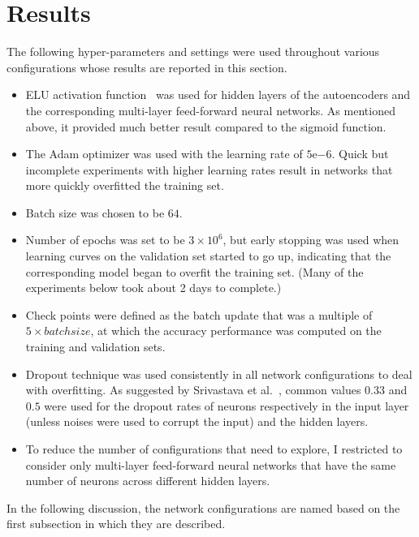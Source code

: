 \documentclass[12pt]{article}
\begin{document}
\section{Results}
\label{sec:results}

\noindent
The following hyper-parameters and settings were used throughout various configurations whose results are reported in this section.
\begin{itemize}
\item ELU activation function~\cite{clevert2015fast} was used for hidden layers of the autoencoders and the corresponding multi-layer feed-forward neural networks. As mentioned above, it provided much better result compared to the sigmoid function.
\item The Adam optimizer was used with the learning rate of $5\mathrm{e}{-6}$. Quick but incomplete experiments with higher learning rates result in networks that more quickly overfitted the training set.
\item Batch size was chosen to be $64$.
\item Number of epochs was set to be $3\times10^6$, but early stopping was used when learning curves on the validation set started to go up, indicating that the corresponding model began to overfit the training set. (Many of the experiments below took about 2 days to complete.)
\item Check points were defined as the batch update that was a multiple of $5 \times batchsize$, at which the accuracy performance was computed on the training and validation sets.
\item Dropout technique was used consistently in all network configurations to deal with overfitting. As suggested by Srivastava et al.~\cite{srivastava2014dropout}, common values $0.33$ and $0.5$ were used for the dropout rates of neurons respectively in the input layer (unless noises were used to corrupt the input) and the hidden layers.
\item To reduce the number of configurations that need to explore, I restricted to consider only multi-layer feed-forward neural networks that have the same number of neurons across different hidden layers.
\end{itemize}

In the following discussion, the network configurations are named based on the first subsection in which they are described.
\end{document}
